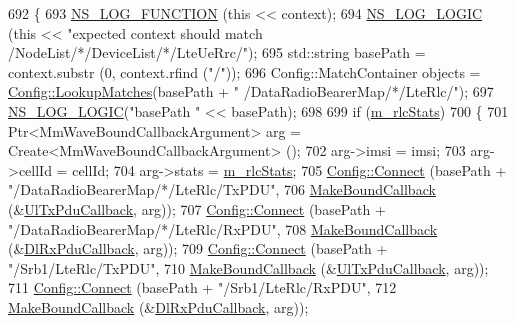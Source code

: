 \begin{DoxyCode}
692 \{
693   \hyperlink{log-macros-disabled_8h_a90b90d5bad1f39cb1b64923ea94c0761}{NS\_LOG\_FUNCTION} (\textcolor{keyword}{this} << context);
694   \hyperlink{group__logging_ga88acd260151caf2db9c0fc84997f45ce}{NS\_LOG\_LOGIC} (\textcolor{keyword}{this} << \textcolor{stringliteral}{"expected context should match /NodeList/*/DeviceList/*/LteUeRrc/"});
695   std::string basePath = context.substr (0, context.rfind (\textcolor{stringliteral}{"/"}));
696   Config::MatchContainer objects = \hyperlink{group__config_ga74aeb63f8f50b4a98043351552ef7db6}{Config::LookupMatches}(basePath + \textcolor{stringliteral}{"
      /DataRadioBearerMap/*/LteRlc/"});
697   \hyperlink{group__logging_ga88acd260151caf2db9c0fc84997f45ce}{NS\_LOG\_LOGIC}(\textcolor{stringliteral}{"basePath "} << basePath);
698 
699   \textcolor{keywordflow}{if} (\hyperlink{classns3_1_1MmWaveBearerStatsConnector_a3613ebbbe92cd828e66b03c91c7ebcbb}{m\_rlcStats})
700     \{
701       Ptr<MmWaveBoundCallbackArgument> arg = Create<MmWaveBoundCallbackArgument> ();
702       arg->imsi = imsi;
703       arg->cellId = cellId; 
704       arg->stats = \hyperlink{classns3_1_1MmWaveBearerStatsConnector_a3613ebbbe92cd828e66b03c91c7ebcbb}{m\_rlcStats};
705       \hyperlink{group__config_ga4014f151241cd0939b6cb64409605736}{Config::Connect} (basePath + \textcolor{stringliteral}{"/DataRadioBearerMap/*/LteRlc/TxPDU"},
706                        \hyperlink{group__makeboundcallback_ga1725d6362e6065faa0709f7c93f8d770}{MakeBoundCallback} (&\hyperlink{namespacens3_ae624428f0992ac62a3c5f2e7318fb98e}{UlTxPduCallback}, arg));
707       \hyperlink{group__config_ga4014f151241cd0939b6cb64409605736}{Config::Connect} (basePath + \textcolor{stringliteral}{"/DataRadioBearerMap/*/LteRlc/RxPDU"},
708                        \hyperlink{group__makeboundcallback_ga1725d6362e6065faa0709f7c93f8d770}{MakeBoundCallback} (&\hyperlink{namespacens3_ae4fb5123d8a56fce742428b530ec4197}{DlRxPduCallback}, arg));
709       \hyperlink{group__config_ga4014f151241cd0939b6cb64409605736}{Config::Connect} (basePath + \textcolor{stringliteral}{"/Srb1/LteRlc/TxPDU"},
710                        \hyperlink{group__makeboundcallback_ga1725d6362e6065faa0709f7c93f8d770}{MakeBoundCallback} (&\hyperlink{namespacens3_ae624428f0992ac62a3c5f2e7318fb98e}{UlTxPduCallback}, arg));
711       \hyperlink{group__config_ga4014f151241cd0939b6cb64409605736}{Config::Connect} (basePath + \textcolor{stringliteral}{"/Srb1/LteRlc/RxPDU"},
712                        \hyperlink{group__makeboundcallback_ga1725d6362e6065faa0709f7c93f8d770}{MakeBoundCallback} (&\hyperlink{namespacens3_ae4fb5123d8a56fce742428b530ec4197}{DlRxPduCallback}, arg));

\end{DoxyCode}
